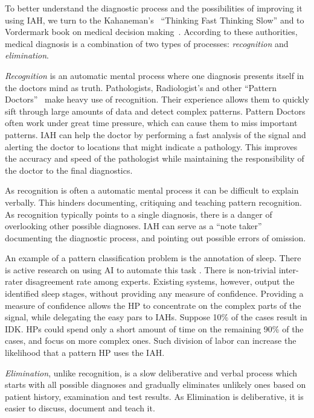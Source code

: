 \documentclass[11pt]{pnas-new}
\begin{document}
To better understand the diagnostic process and the possibilities  of
improving it using IAH, we turn to the Kahaneman's~\cite{kahneman2011thinking}
``Thinking Fast Thinking Slow'' and to Vordermark book on medical
decision making~\cite{vordermark2019introduction}. According to these authorities,
medical diagnosis is a combination of two types of processes: {\em
  recognition} and {\em elimination}.

{\em Recognition} is an automatic mental process where one diagnosis
presents itself in the doctors mind as truth. Pathologists,
Radiologist's and other ``Pattern Doctors''~\cite{topol2019deep} make heavy use
of recognition. Their experience allows them to quickly sift through
large amounts of data and detect complex patterns. Pattern Doctors 
often work under great time pressure, which can cause them to miss
important patterns. IAH can help the doctor by performing a fast
analysis of the signal and alerting the doctor to locations that might
indicate a pathology. This improves the accuracy and speed of the
pathologist while maintaining the responsibility of the doctor to the
final diagnostics. 

As recognition is often a automatic mental process it can be difficult to explain verbally.
This hinders documenting, critiquing and teaching pattern recognition. As
recognition typically points to a single diagnosis, there is a danger
of overlooking other possible diagnoses. IAH can serve as a ``note
taker'' documenting the diagnostic process, and pointing out possible
errors of omission. 

An example of a pattern classification problem is the annotation of
sleep. There is active research on using AI to automate this task
\cite{sleepHT2020}.
There is non-trivial inter-rater disagreement rate among experts.  
Existing systems, however, output the identified sleep stages, 
without providing any measure of confidence. Providing a measure of confidence allows the HP to concentrate on the complex parts of the signal, while delegating the easy pars to IAHs. 
Suppose 10\% of the cases result in IDK. HPs could spend only a short amount of time on the remaining 90\% of the cases, and focus on more complex ones.
Such division of labor can increase the likelihood that a pattern HP uses the IAH.

{\em Elimination}, unlike recognition, is a slow deliberative and
verbal process which starts with all possible diagnoses and gradually
eliminates unlikely ones based on patient history, examination and
test results. As Elimination is deliberative, it is easier to discuss,
document and teach it.
\end{document}
